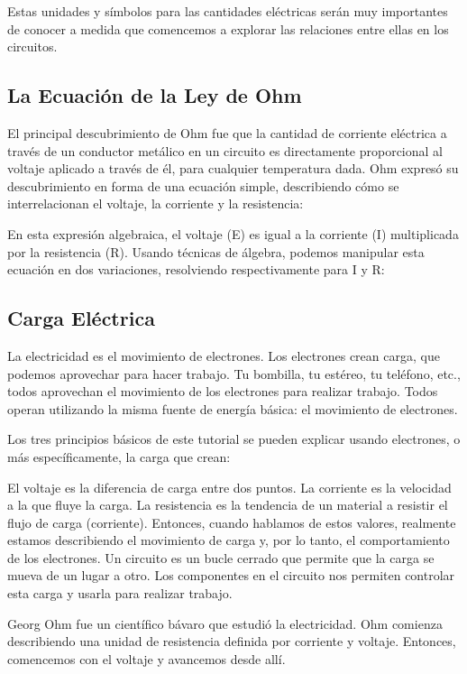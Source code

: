 \documentclass[output=paper, 
colorlinks,
citecolor=brown,
newtxmath
]{langscibook}
\begin{document}
Estas unidades y símbolos para las cantidades eléctricas serán muy importantes de conocer a medida que comencemos a explorar las relaciones entre ellas en los circuitos.

\subsection{La Ecuación de la Ley de Ohm}
El principal descubrimiento de Ohm fue que la cantidad de corriente eléctrica a través de un conductor metálico en un circuito es directamente proporcional al voltaje aplicado a través de él, para cualquier temperatura dada. Ohm expresó su descubrimiento en forma de una ecuación simple, describiendo cómo se interrelacionan el voltaje, la corriente y la resistencia:

En esta expresión algebraica, el voltaje (E) es igual a la corriente (I) multiplicada por la resistencia (R). Usando técnicas de álgebra, podemos manipular esta ecuación en dos variaciones, resolviendo respectivamente para I y R:




\subsection{Carga Eléctrica}

La electricidad es el movimiento de electrones. Los electrones crean carga, que podemos aprovechar para hacer trabajo. Tu bombilla, tu estéreo, tu teléfono, etc., todos aprovechan el movimiento de los electrones para realizar trabajo. Todos operan utilizando la misma fuente de energía básica: el movimiento de electrones.

Los tres principios básicos de este tutorial se pueden explicar usando electrones, o más específicamente, la carga que crean:

El voltaje es la diferencia de carga entre dos puntos.
La corriente es la velocidad a la que fluye la carga.
La resistencia es la tendencia de un material a resistir el flujo de carga (corriente).
Entonces, cuando hablamos de estos valores, realmente estamos describiendo el movimiento de carga y, por lo tanto, el comportamiento de los electrones. Un circuito es un bucle cerrado que permite que la carga se mueva de un lugar a otro. Los componentes en el circuito nos permiten controlar esta carga y usarla para realizar trabajo.

Georg Ohm fue un científico bávaro que estudió la electricidad. Ohm comienza describiendo una unidad de resistencia definida por corriente y voltaje. Entonces, comencemos con el voltaje y avancemos desde allí.
\end{document}
